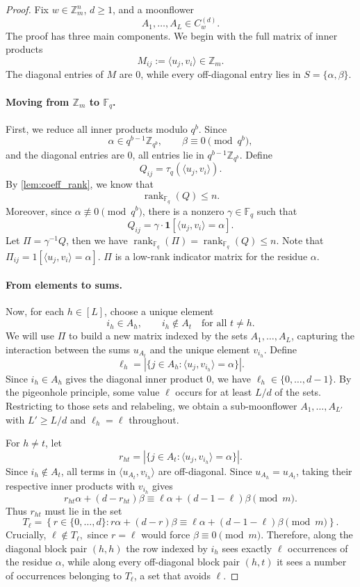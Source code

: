 \documentclass[10pt,a4paper]{amsart}
\newcommand{\F}{\mathbb{F}}
\newcommand{\Z}{\mathbb{Z}}
\begin{document}
\begin{proof}
Fix $w\in\Z_m^n$, $d\ge 1$, and a moonflower
\[
A_1,\ldots,A_L \in C_w^{(d)}.
\]
The proof has three main components. We begin with the full matrix of inner products
\[
M_{ij}:=\langle u_j,v_i\rangle\in\Z_m .
\]
The diagonal entries of $M$ are $0$, while every off-diagonal entry lies in
$S = \{\alpha,\beta\}$.

\paragraph{Moving from $\Z_m$ to $\F_q$.} First, we reduce all inner products modulo $q^b$. Since
\[
\alpha\in q^{b-1}\mathbb Z_{q^b},
\qquad
\beta\equiv 0\pmod {q^b},
\]
and the diagonal entries are $0$, all entries lie in $q^{b-1}\mathbb Z_{q^b}$. Define
\[
Q_{ij}
=
\tau_q(\langle u_j,v_i\rangle).
\]
By \cref{lem:coeff_rank}, we know that
\[
\operatorname{rank}_{\mathbb F_q}(Q)\le n.
\]
Moreover, since $\alpha \not\equiv 0\pmod{q^b}$, there is a nonzero $\gamma\in\mathbb F_q$ such that
\[
Q_{ij}
=
\gamma\cdot \mathbf 1[\langle u_j,v_i\rangle=\alpha].
\]
Let $\Pi = \gamma^{-1} Q$, then we have $\operatorname{rank}_{\mathbb F_q}(\Pi) = \operatorname{rank}_{\mathbb F_q}(Q) \le n$. Note that $\Pi_{ij} = 1[\langle u_j,v_i\rangle=\alpha].$ $\Pi$ is a low-rank indicator matrix for the residue $\alpha$. 

\paragraph{From elements to sums.} Now, for each $h\in[L]$, choose a unique element
\[
i_h\in A_h,
\qquad
i_h\notin A_t\quad\text{for all }t\ne h. 
\]
We will use
$\Pi$ to build a new matrix indexed by the sets $A_1,\ldots,A_L$, capturing the
interaction between the sums $u_{A_t}$ and the unique element $v_{i_h}$.
Define
\[
\ell_h
=
\left|\{j\in A_h:\langle u_j,v_{i_h}\rangle=\alpha\}\right|.
\]
Since $i_h\in A_h$ gives the diagonal inner product $0$, we have
$\ell_h\in\{0,\ldots,d-1\}$. By the pigeonhole principle, some value $\ell$ occurs for at least $L/d$ of the sets. Restricting to those sets and relabeling, we obtain a sub-moonflower $A_1,\ldots,A_{L'}$ with $L'\ge L/d$ and $\ell_h=\ell$ throughout.

For $h\ne t$, let
\[
r_{ht}
=
\left|\{j\in A_t:\langle u_j,v_{i_h}\rangle=\alpha\}\right|.
\]
Since $i_h\notin A_t$, all terms in
$\langle u_{A_t},v_{i_h}\rangle$ are off-diagonal. Since
$u_{A_h}=u_{A_t}$, taking their respective inner products with $v_{i_h}$ gives
\[
r_{ht}\alpha+(d-r_{ht})\beta
\equiv
\ell\alpha+(d-1-\ell)\beta
\pmod m.
\]
Thus $r_{ht}$ must lie in the set
\[
T_\ell
=
\left\{
r\in\{0,\ldots,d\}:
r\alpha+(d-r)\beta
\equiv
\ell\alpha+(d-1-\ell)\beta
\pmod m
\right\}.
\]
Crucially, $\ell\notin T_\ell,$
since $r=\ell$ would force $\beta\equiv0\pmod m$. Therefore, along the diagonal block pair $(h,h)$ the row indexed by $i_h$
sees exactly $\ell$ occurrences of the residue $\alpha$, while along every
off-diagonal block pair $(h,t)$ it sees a number of occurrences belonging to
$T_\ell$, a set that avoids $\ell$.


\end{proof}
\end{document}
